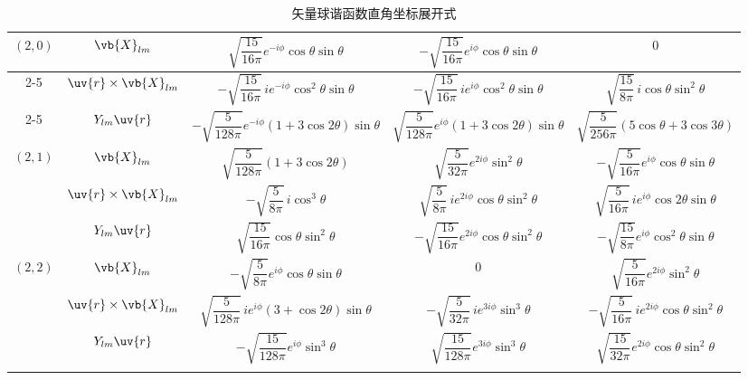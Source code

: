 \begin{longtable}{ccccc}
	\midrule
	\multirow{3}{*}{\((2,0)\)}
	          & \(\vb{X}_{lm}\)             & \(\sqrt{\dfrac{15}{16\pi}} e^{-i\phi} \cos\theta \sin\theta\)                    & \(-\sqrt{\dfrac{15}{16\pi}} e^{i\phi} \cos\theta \sin\theta\)                & \(0\)                                                                \\
	\cmidrule(lr){2-5}
	          & \(\uv{r}\times\vb{X}_{lm}\) & \(-\sqrt{\dfrac{15}{16\pi}} \, i e^{-i\phi} \cos^2\theta\sin\theta\)             & \(-\sqrt{\dfrac{15}{16\pi}} \, i e^{i\phi} \cos^2\theta\sin\theta\)          & \(\sqrt{\dfrac{15}{8\pi}} \, i \cos\theta\sin^2\theta\)              \\
	\cmidrule(lr){2-5}
	          & \(Y_{lm}\uv{r}\)            & \(-\sqrt{\dfrac{5}{128\pi}} e^{-i\phi} \left(1+3\cos2\theta\right)\sin\theta\)   & \(\sqrt{\dfrac{5}{128\pi}} e^{i\phi} \left(1+3\cos2\theta\right)\sin\theta\) & \(\sqrt{\dfrac{5}{256\pi}} \left(5\cos\theta+3\cos3\theta\right)\)   \\
	\midrule
	\multirow{3}{*}{\((2,1)\)}
	          & \(\vb{X}_{lm}\)             & \(\sqrt{\dfrac{5}{128\pi}} \left(1+3\cos2\theta\right)\)                         & \(\sqrt{\dfrac{5}{32\pi}} e^{2i\phi} \sin^2\theta\)                          & \(-\sqrt{\dfrac{5}{16\pi}} e^{i\phi} \cos\theta \sin\theta\)         \\
	\cmidrule(lr){2-5}
	          & \(\uv{r}\times\vb{X}_{lm}\) & \(-\sqrt{\dfrac{5}{8\pi}} \, i \cos^3\theta\)                                    & \(\sqrt{\dfrac{5}{8\pi}} \, i e^{2i\phi} \cos\theta\sin^2\theta\)            & \(\sqrt{\dfrac{5}{16\pi}} \, i e^{i\phi} \cos2\theta\sin\theta\)     \\
	\cmidrule(lr){2-5}
	          & \(Y_{lm}\uv{r}\)            & \(\sqrt{\dfrac{15}{16\pi}} \cos\theta\sin^2\theta\)                              & \(-\sqrt{\dfrac{15}{16\pi}} e^{2i\phi} \cos\theta\sin^2\theta\)              & \(-\sqrt{\dfrac{15}{8\pi}} e^{i\phi} \cos^2\theta\sin\theta\)        \\
	\midrule
	\multirow{3}{*}{\((2,2)\)}
	          & \(\vb{X}_{lm}\)             & \(-\sqrt{\dfrac{5}{8\pi}} e^{i\phi} \cos\theta \sin\theta\)                      & \(0\)                                                                        & \(\sqrt{\dfrac{5}{16\pi}} e^{2i\phi} \sin^2\theta\)                  \\
	\cmidrule(lr){2-5}
	          & \(\uv{r}\times\vb{X}_{lm}\) & \(\sqrt{\dfrac{5}{128\pi}} \, i e^{i\phi} \left(3+\cos2\theta\right)\sin\theta\) & \(-\sqrt{\dfrac{5}{32\pi}} \, i e^{3i\phi} \sin^3\theta\)                    & \(-\sqrt{\dfrac{5}{16\pi}} \, i e^{2i\phi} \cos\theta\sin^2\theta\)  \\
	\cmidrule(lr){2-5}
	          & \(Y_{lm}\uv{r}\)            & \(-\sqrt{\dfrac{15}{128\pi}} e^{i\phi} \sin^3\theta\)                            & \(\sqrt{\dfrac{15}{128\pi}} e^{3i\phi} \sin^3\theta\)                        & \(\sqrt{\dfrac{15}{32\pi}} e^{2i\phi} \cos\theta\sin^2\theta\)       \\
	\bottomrule[1pt]
	\caption{矢量球谐函数直角坐标展开式}
	\label{fig:vsh_cartesian_expansion}
\end{longtable}


